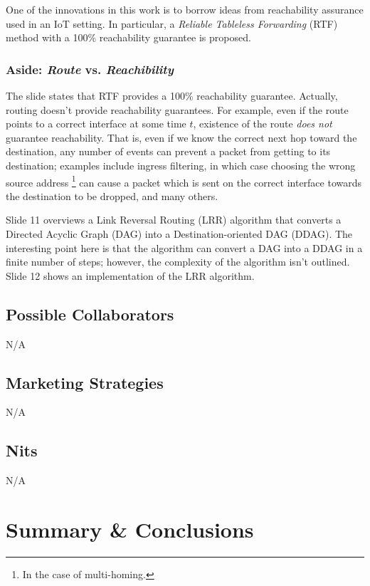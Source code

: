 \documentclass[11pt, oneside]{article}   	%
\begin{document}
\bigskip
\noindent
One of the innovations in this work is to borrow ideas from reachability assurance used in an IoT setting. In particular,  a \emph{Reliable Tableless Forwarding} (RTF)
method with a 100\% reachability guarantee is proposed.

\subsubsection{Aside: \emph{Route} vs.  \emph{Reachibility}}
\label{subsubsec:route_vs_reachability}
The slide states that RTF provides a 100\% reachability guarantee. Actually, routing doesn't provide reachability guarantees. For example, even if the route points to 
a correct interface at some time $t$,  existence of the route \emph{does not} guarantee reachability. That is, even if we know the correct next hop toward the destination,
any number of events can prevent a packet from getting to its destination; examples include ingress filtering, in which case choosing the wrong source address
\footnote{In the case of multi-homing.} can cause a packet which is sent on the correct interface towards the destination to be dropped, and many others.
 
 \bigskip
 \noindent
 Slide 11 overviews a Link Reversal Routing (LRR)  algorithm that converts a Directed Acyclic Graph (DAG) into a Destination-oriented DAG (DDAG). The interesting point here
 is that the algorithm can convert a DAG into a DDAG in a finite number of steps; however, the complexity of the algorithm isn't outlined. Slide 12 shows an implementation
 of the LRR algorithm.

\subsection{Possible Collaborators}
\label{slide10:possible_collaborators}
N/A

\subsection{Marketing Strategies}
\label{slide10:marketing_strategies}
N/A

\subsection{Nits}
\label{slide10:nits}
N/A

\section{Summary \& Conclusions}
\label{sec:conclusions}
\end{document}
